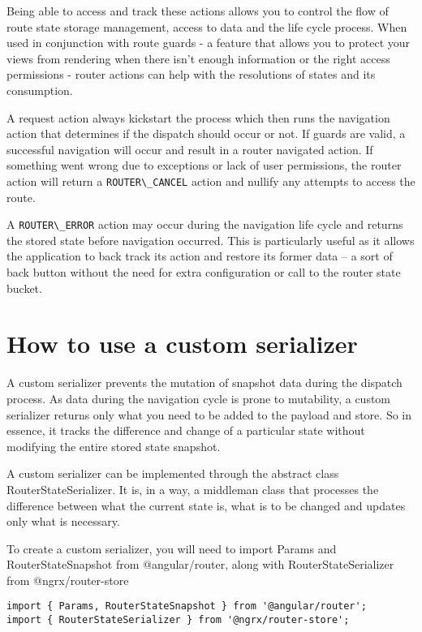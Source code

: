 Being able to access and track these actions allows you to control the flow of
route state storage management, access to data and the life cycle process. When
used in conjunction with route guards - a feature that allows you to protect
your views from rendering when there isn't enough information or the right
access permissions - router actions can help with the resolutions of states and
its consumption.

A request action always kickstart the process which then runs the navigation
action that determines if the dispatch should occur or not. If guards are valid,
a successful navigation will occur and result in a router navigated action. If
something went wrong due to exceptions or lack of user permissions, the router
action will return a \lstinline{ROUTER\_CANCEL} action and nullify any attempts to
access the route.

A \lstinline{ROUTER\_ERROR} action may occur during the navigation life cycle and
returns the stored state before navigation occurred. This is particularly useful
as it allows the application to back track its action and restore its former
data – a sort of back button without the need for extra configuration or call
to the router state bucket.

\section{How to use a custom serializer}

A custom serializer prevents the mutation of snapshot data during the dispatch
process. As data during the navigation cycle is prone to mutability, a custom
serializer returns only what you need to be added to the payload and store. So
in essence, it tracks the difference and change of a particular state without
modifying the entire stored state snapshot.

A custom serializer can be implemented through the abstract class
RouterStateSerializer. It is, in a way, a middleman class that processes the
difference between what the current state is, what is to be changed and updates
only what is necessary.

To create a custom serializer, you will need to import Params and
RouterStateSnapshot from @angular/router, along with RouterStateSerializer from
@ngrx/router-store
\begin{verbatim}
import { Params, RouterStateSnapshot } from '@angular/router';
import { RouterStateSerializer } from '@ngrx/router-store';
\end{verbatim}

